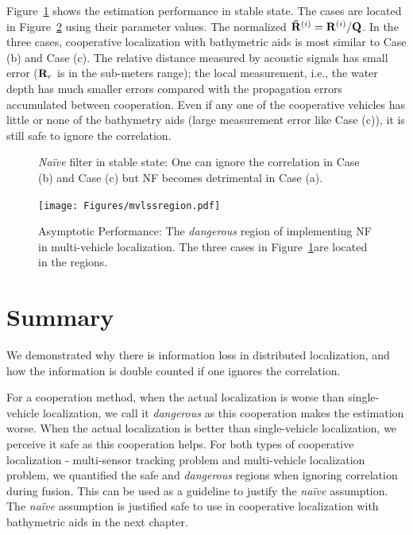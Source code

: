 Figure~\ref{fig:sscases} shows the estimation performance in stable state. The cases are located in Figure~\ref{fig:mvlssRegion} using their parameter values. The normalized ${\bf\bar R}^{(i)}={\bf R}^{(i)}/{\bf Q}$. In the three cases, cooperative localization with bathymetric aids is most similar to Case (b) and Case (c). The relative distance measured by acoustic signals has small error (${\bf R}_r$ is in the sub-meters range); the local measurement, i.e., the water depth has much smaller errors compared with the propagation errors accumulated between cooperation. Even if any one of the cooperative vehicles has little or none of the bathymetry aids (large measurement error like Case (c)), it is still safe to ignore the correlation.

\begin{figure}[htbp]
\centering
{}
\caption{\textit{Na\"ive} filter in stable state: One can ignore the correlation in Case (b) and Case (c) but NF becomes detrimental in Case (a).}
\label{fig:sscases}
\end{figure}

\begin{figure}[htbp]
  \centering
    \texttt{[image: Figures/mvlssregion.pdf]}
      \caption{Asymptotic Performance: The \textit{dangerous} region of implementing NF in multi-vehicle localization. The three cases in Figure~\ref{fig:sscases}are located in the regions.}
      \label{fig:mvlssRegion}
\end{figure}

\section{Summary}

We demonstrated why there is information loss in distributed localization, and how the information is double counted if one ignores the correlation.

For a cooperation method, when the actual localization is worse than single-vehicle localization, we call it \textit{dangerous} as this cooperation makes the estimation worse. When the actual localization is better than single-vehicle localization, we perceive it safe as this cooperation helps. For both types of cooperative localization - multi-sensor tracking problem and multi-vehicle localization problem, we quantified the safe and \textit{dangerous} regions when ignoring correlation during fusion. This can be used as a guideline to justify the \textit{na\"ive} assumption. The \textit{na\"ive} assumption is justified safe to use in cooperative localization with bathymetric aids in the next chapter.